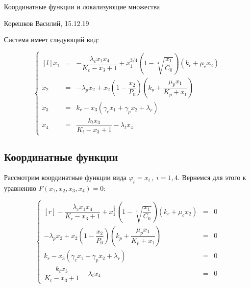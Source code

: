 \documentclass[12pt,a4paper]{article}
\begin{document}
\begin{center}
    \large Координатные функции и локализующие множества
\end{center}
\begin{flushright}
    Корешков Василий, 15.12.19
\end{flushright}

{\large Система имеет следующий вид:}

\begin{equation}
    \left\{
    \begin{matrix*}[l]
    \dot{x}_1 & = & - \dfrac{\lambda_{c} x_{1} x_{4}}{K_{c} - x_{3} + 1} + x_{1}^{3/4} \left(1 - \sqrt[4]{\dfrac{x_{1}}{C_{0}}}\right) \left(k_{c} + \mu_{c} x_{2}\right)
    \\
    \dot{x}_2 & = & - \lambda_{p} x_{2} + x_{2} \left(1 - \dfrac{x_{2}}{P_{0}}\right) \left(k_{p} + \dfrac{\mu_{p} x_{1}}{K_{p} + x_{1}}\right)
    \\
    \dot{x}_3 & = & k_{r} - x_{3} \left(\gamma_{c} x_{1} + \gamma_{p} x_{2} + \lambda_{r}\right)
    \\
    \dot{x}_4 & = & \dfrac{k_{t} x_{3}}{K_{t} - x_{3} + 1} - \lambda_{t} x_{4}
    \end{matrix*}
    \right.
\end{equation}

\subsection{Координатные функции}

Рассмотрим координатные функции вида
\(\varphi_i = x_i\,,\; i = \overline{1,4}.\) Вернемся для этого к
уравнению \(F(x_1,x_2,x_3,x_4) = 0:\)


\begin{equation*}
    \left\{
        \begin{matrix*}[r]
            - \dfrac{\lambda_{c} x_{1} x_{4}}{K_{c} - x_{3} + 1} + x_{1}^{\frac{3}{4}} \left(1 - \sqrt[4]{\dfrac{x_{1}}{C_{0}}}\right) \left(k_{c} + \mu_{c} x_{2}\right) &=& 0
            \\
            - \lambda_{p} x_{2} + x_{2} \left(1 - \dfrac{x_{2}}{P_{0}}\right) \left(k_{p} + \dfrac{\mu_{p} x_{1}}{K_{p} + x_{1}}\right) &=&  0
            \\
            k_{r} - x_{3} \left(\gamma_{c} x_{1} + \gamma_{p} x_{2} + \lambda_{r}\right) &=& 0
            \\
            \dfrac{k_{t} x_{3}}{K_{t} - x_{3} + 1} - \lambda_{t} x_{4} &=& 0
        \end{matrix*}
    \right.
\end{equation*}
\end{document}
